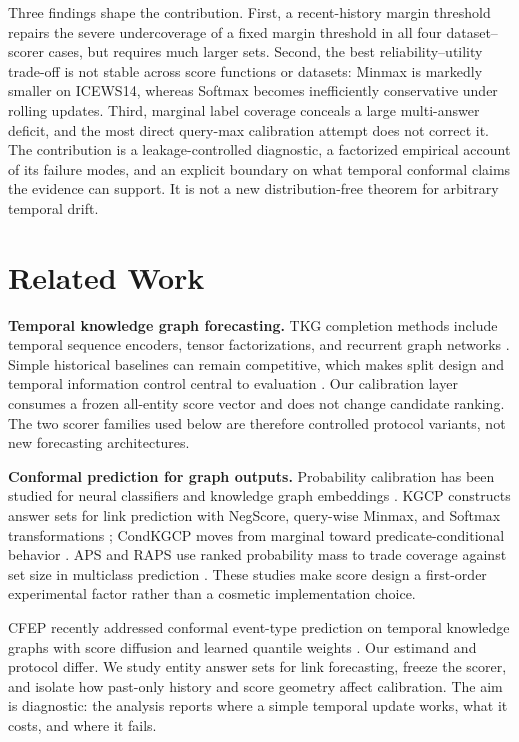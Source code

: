 \documentclass[information,article,submit,oneauthor,pdftex]{Definitions/mdpi}
\begin{document}
Three findings shape the contribution. First, a recent-history margin threshold
repairs the severe undercoverage of a fixed margin threshold in all four
dataset--scorer cases, but requires much larger sets. Second, the best
reliability--utility trade-off is not stable across score functions or datasets:
Minmax is markedly smaller on ICEWS14, whereas Softmax becomes inefficiently
conservative under rolling updates. Third, marginal label coverage conceals a
large multi-answer deficit, and the most direct query-max calibration attempt
does not correct it. The contribution is a leakage-controlled diagnostic, a
factorized empirical account of its failure modes, and an explicit boundary on
what temporal conformal claims the evidence can support. It is not a new
distribution-free theorem for arbitrary temporal drift.

\section{Related Work}
\label{sec:related}

\textbf{Temporal knowledge graph forecasting.}
TKG completion methods include temporal sequence encoders, tensor
factorizations, and recurrent graph networks
\cite{garciaduran2018sequence,lacroix2020tcomplex,li2021regcn,li2022tirgn}.
Simple historical baselines can remain competitive, which makes split design
and temporal information control central to evaluation
\cite{gastinger2024repeat,gastinger2024tgb2}. Our calibration layer consumes a
frozen all-entity score vector and does not change candidate ranking. The two
scorer families used below are therefore controlled protocol variants, not new
forecasting architectures.

\textbf{Conformal prediction for graph outputs.}
Probability calibration has been studied for neural classifiers and knowledge
graph embeddings \cite{guo2017calibration,safavi2020calibration}. KGCP constructs
answer sets for link prediction with NegScore, query-wise Minmax, and Softmax
transformations \cite{zhu2025kgcp}; CondKGCP moves from marginal toward
predicate-conditional behavior \cite{zhu2025condkgcp}. APS and RAPS use ranked
probability mass to trade coverage against set size in multiclass prediction
\cite{angelopoulos2021raps}. These studies make score design a first-order
experimental factor rather than a cosmetic implementation choice.

CFEP recently addressed conformal event-type prediction on temporal knowledge
graphs with score diffusion and learned quantile weights \cite{hu2026cfep}.
Our estimand and protocol differ. We study entity answer sets for link
forecasting, freeze the scorer, and isolate how past-only history and score
geometry affect calibration. The aim is diagnostic: the analysis reports where
a simple temporal update works, what it costs, and where it fails.
\end{document}
